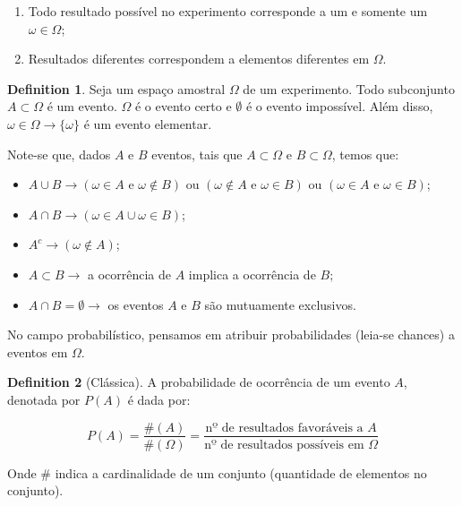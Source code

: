 \documentclass[
]{article}
\providecommand{\tightlist}{%
  \setlength{\itemsep}{0pt}\setlength{\parskip}{0pt}}
\theoremstyle{definition}
\newtheorem{definition}{Definition}[section]
\theoremstyle{definition}
\theoremstyle{definition}
\theoremstyle{definition}
\theoremstyle{remark}
\begin{document}
\begin{enumerate}
\def\labelenumi{\arabic{enumi}.}
\tightlist
\item
  Todo resultado possível no experimento corresponde a um e somente um \(\omega \in \Omega\);
\item
  Resultados diferentes correspondem a elementos diferentes em \(\Omega\).
\end{enumerate}

\begin{definition}
Seja um espaço amostral \(\Omega\) de um experimento. Todo subconjunto \(A \subset \Omega\) é um evento. \(\Omega\) é o evento certo e \(\emptyset\) é o evento impossível. Além disso, \(\omega \in \Omega \to \{\omega\}\) é um evento elementar.
\end{definition}

Note-se que, dados \(A\) e \(B\) eventos, tais que \(A \subset \Omega\) e \(B \subset \Omega\), temos que:

\begin{itemize}
\tightlist
\item
  \(A \cup B \to (\omega \in A \text{ e } \omega \notin B)\) ou \((\omega \notin A \text{ e } \omega \in B)\) ou \((\omega \in A \text{ e } \omega \in B)\);
\item
  \(A \cap B \to (\omega \in A \cup \omega \in B)\);
\item
  \(A^{c} \to (\omega \notin A)\);
\item
  \(A \subset B \to\) a ocorrência de \(A\) implica a ocorrência de \(B\);
\item
  \(A \cap B = \emptyset \to\) os eventos \(A\) e \(B\) são mutuamente exclusivos.
\end{itemize}

No campo probabilístico, pensamos em atribuir probabilidades (leia-se chances) a eventos em \(\Omega\).

\begin{definition}[Clássica]
A probabilidade de ocorrência de um evento \(A\), denotada por \(P(A)\) é dada por:

\[P(A) = \frac{\#(A)}{\#(\Omega)} = \frac{\text{nº de resultados favoráveis a }A}{\text{nº de resultados possíveis em }\Omega}\]

Onde \(\#\) indica a cardinalidade de um conjunto (quantidade de elementos no conjunto).
\end{definition}
\end{document}
